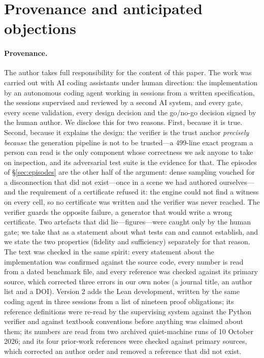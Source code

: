 \documentclass[10pt,twocolumn,letterpaper]{article}
\newif\ifhl \hlfalse  %
\newcommand{\new}[1]{\ifhl{\color{blue!65!black}#1}\else#1\fi}
\begin{document}
\section{Provenance and anticipated objections}\label{sec:reviewers}

\paragraph{Provenance.} The author takes full responsibility for the content of this paper. The work was carried out with AI coding assistants under human direction: the implementation by an autonomous coding agent working in sessions from a written specification, the sessions supervised and reviewed by a second AI system, and every gate, every scene validation, every design decision and the go/no-go decision signed by the human author. We disclose this for two reasons. First, because it is true. Second, because it explains the design: the verifier is the trust anchor \emph{precisely because} the generation pipeline is not to be trusted---a 499-line exact program a person can read is the only component whose correctness we ask anyone to take on inspection, and its adversarial test suite is the evidence for that. The episodes of \S\ref{sec:episodes} are the other half of the argument: dense sampling vouched for a disconnection that did not exist---once in a scene we had authored ourselves---and the requirement of a certificate refused it: the engine could not find a witness on every cell, so no certificate was written and the verifier was never reached. The verifier guards the opposite failure, a generator that would write a wrong certificate. Two artefacts that did lie---figures---were caught only by the human gate; we take that as a statement about what tests can and cannot establish, and we state the two properties (fidelity and sufficiency) separately for that reason. The text was checked in the same spirit: every statement about the implementation was confirmed against the source code, every number is read from a dated benchmark file, and every reference was checked against its primary source, which corrected three errors in our own notes (a journal title, an author list and a DOI). \new{Version 2 adds the Lean development, written by the same coding agent in three sessions from a list of nineteen proof obligations; its reference definitions were re-read by the supervising system against the Python verifier and against textbook conventions before anything was claimed about them; its numbers are read from two archived quiet-machine runs of 10 October 2026; and its four prior-work references were checked against primary sources, which corrected an author order and removed a reference that did not exist.}
\end{document}
